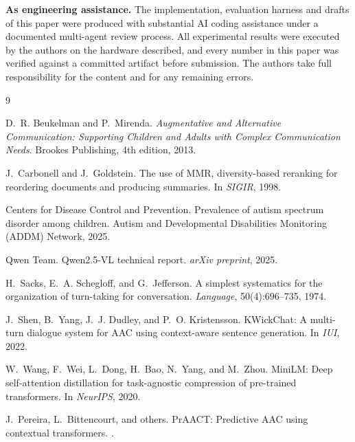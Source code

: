 \documentclass{article}
\begin{document}
\textbf{As engineering assistance.} The implementation, evaluation harness and
drafts of this paper were produced with substantial AI coding assistance under a
documented multi-agent review process. All experimental results were executed by
the authors on the hardware described, and every number in this paper was
verified against a committed artifact before submission. The authors take full
responsibility for the content and for any remaining errors.

\begin{thebibliography}{9}

D.~R. Beukelman and P.~Mirenda.
\newblock \emph{Augmentative and Alternative Communication: Supporting Children
and Adults with Complex Communication Needs}.
\newblock Brookes Publishing, 4th edition, 2013.

J.~Carbonell and J.~Goldstein.
\newblock The use of MMR, diversity-based reranking for reordering documents and
producing summaries.
\newblock In \emph{SIGIR}, 1998.

Centers for Disease Control and Prevention.
\newblock Prevalence of autism spectrum disorder among children.
\newblock Autism and Developmental Disabilities Monitoring (ADDM) Network, 2025.

Qwen Team.
\newblock Qwen2.5-VL technical report.
\newblock \emph{arXiv preprint}, 2025.

H.~Sacks, E.~A. Schegloff, and G.~Jefferson.
\newblock A simplest systematics for the organization of turn-taking for
conversation.
\newblock \emph{Language}, 50(4):696--735, 1974.

J.~Shen, B.~Yang, J.~J. Dudley, and P.~O. Kristensson.
\newblock KWickChat: A multi-turn dialogue system for AAC using context-aware
sentence generation.
\newblock In \emph{IUI}, 2022.

W.~Wang, F.~Wei, L.~Dong, H.~Bao, N.~Yang, and M.~Zhou.
\newblock MiniLM: Deep self-attention distillation for task-agnostic compression
of pre-trained transformers.
\newblock In \emph{NeurIPS}, 2020.

J.~Pereira, L.~Bittencourt, and others.
\newblock PrAACT: Predictive AAC using contextual transformers.
.

\end{thebibliography}
\end{document}

